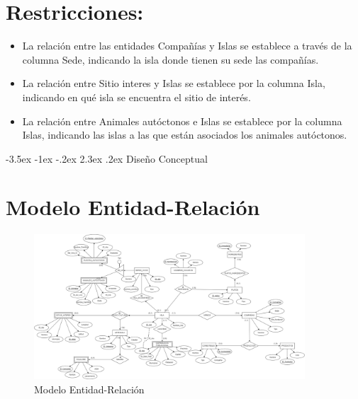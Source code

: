 \documentclass[11pt]{report}
\makeatletter
\renewcommand\chapter{\@startsection{chapter}{0}{\z@}%
    {-3.5ex \@plus -1ex \@minus -.2ex}%
    {2.3ex \@plus.2ex}%
    {\normalfont\Large\bfseries}}
\makeatother
\begin{document}
\section{Restricciones:}

\begin{itemize}
      \item La relación entre las entidades Compañías y Islas se establece a través de la columna Sede, indicando la isla donde tienen su sede las compañías.
      \item La relación entre Sitio interes y Islas se establece por la columna Isla, indicando en qué isla se encuentra el sitio de interés.
      \item La relación entre Animales autóctonos e Islas se establece por la columna Islas, indicando las islas a las que están asociados los animales autóctonos.
\end{itemize}
\chapter{Diseño Conceptual}

\section{Modelo Entidad-Relación}
\begin{figure}[H]
      \centering
      \includegraphics[width=0.9\textwidth]{../diagrams/ER-PF-ADBD.png}
      \caption{Modelo Entidad-Relación}
      \label{fig:modelo_er}
\end{figure}
\end{document}

